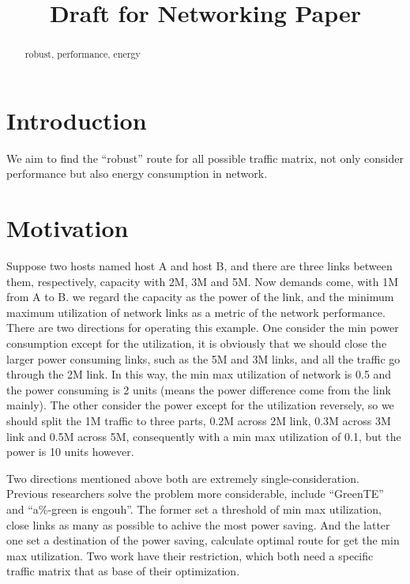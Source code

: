\documentclass[conference]{IEEEtran}
\begin{document}
\title{Draft for Networking Paper}


\author{
\and
{}
\and
{}
}


\maketitle

\begin{abstract}
robust, performance, energy
\end{abstract}

\IEEEpeerreviewmaketitle

\section{Introduction}
We aim to find the ``robust'' route for all possible traffic matrix, not only consider performance but also energy 
consumption in network.

\section{Motivation}
Suppose two hosts named host A and host B, and there are three links between 
them, respectively, capacity with 2M, 3M and 5M. Now demands come, with 1M from A to B. we regard the capacity 
as the power of the link, and the minimum maximum utilization of network links as a metric of the network performance. 
There are two directions for operating this example. One consider the min power consumption except for the 
utilization, it is obviously that we should close the larger power consuming links, such as the 5M and 3M links, and 
all the traffic go through the 2M link. In this way, the min max utilization of network is 0.5 and the power consuming 
is 2 units (means the power difference come from the link mainly). The other consider the power except for the 
utilization reversely, so we should split the 1M traffic to three parts, 0.2M across 2M link, 0.3M across 3M link and 
0.5M across 5M, consequently with a min max utilization of 0.1, but the power is 10 units however.

Two directions mentioned above both are extremely single-consideration. Previous researchers solve the problem more 
considerable, include ``GreenTE'' and ``a\%-green is engouh''. The former set a threshold of min max utilization, 
close links as many as possible to achive the most power saving. And the latter one set a destination of the power 
saving, calculate optimal route for get the min max utilization. Two work have their restriction, which both need a 
specific traffic matrix that as base of their optimization.
\end{document}
